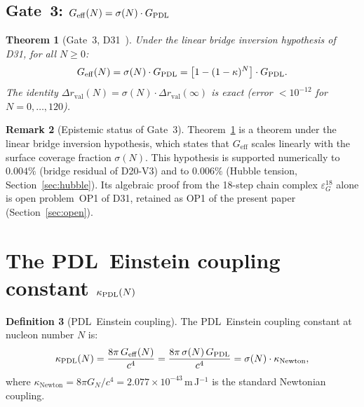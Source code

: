 \documentclass[11pt,a4paper]{article}
\newtheorem{theorem}{Theorem}[section]
\theoremstyle{definition}
\newtheorem{definition}[theorem]{Definition}
\newtheorem{remark}[theorem]{Remark}
\newcommand{\PDL}{\textnormal{PDL}}
\newcommand{\GPDL}{G_{\PDL}}
\newcommand{\Geff}{G_{\mathrm{eff}}}
\newcommand{\sig}{\sigma}
\newcommand{\kap}{\kappa}
\newcommand{\kPDL}{\kappa_{\PDL}}
\begin{document}
\subsection{Gate~3: \texorpdfstring{$\Geff(N) = \sig(N) \cdot \GPDL$}{Geff(N) = sigma(N) * GPDL}}

\begin{theorem}[Gate~3, D31~\cite{PDL_D31_2026}]
\label{thm:gate3}
Under the linear bridge inversion hypothesis of D31, for all $N \geq 0$:
\begin{equation}
\Geff(N) = \sig(N)\cdot\GPDL = \bigl[1-(1-\kap)^N\bigr]\cdot\GPDL.
\label{eq:Geff}
\end{equation}
The identity $\Delta r_{\mathrm{val}}(N) = \sig(N)\cdot\Delta r_{\mathrm{val}}(\infty)$ is exact (error $< 10^{-12}$ for $N = 0,\ldots,120$).
\end{theorem}

\begin{remark}[Epistemic status of Gate~3]
\label{rem:gate3_status}
Theorem~\ref{thm:gate3} is a theorem under the linear bridge inversion hypothesis, which states that $\Geff$ scales linearly with the surface coverage fraction $\sig(N)$. This hypothesis is supported numerically to $0.004\%$ (bridge residual of D20-V3) and to $0.006\%$ (Hubble tension, Section~\ref{sec:hubble}). Its algebraic proof from the 18-step chain complex $\varepsilon_G^{18}$ alone is open problem~OP1 of D31, retained as OP1 of the present paper (Section~\ref{sec:open}).
\end{remark}

\section{The \PDL\ Einstein coupling constant \texorpdfstring{$\kPDL(N)$}{kappa	extsubscript{PDL}(N)}}
\label{sec:kappa}

\begin{definition}[\PDL\ Einstein coupling]
\label{def:kappa_PDL}
The \PDL\ Einstein coupling constant at nucleon number $N$ is:
\begin{equation}
\kPDL(N) = \frac{8\pi\,\Geff(N)}{c^4} = \frac{8\pi\,\sig(N)\,\GPDL}{c^4} = \sig(N)\cdot\kappa_{\mathrm{Newton}},
\label{eq:kappa_PDL}
\end{equation}
where $\kappa_{\mathrm{Newton}} = 8\pi G_N/c^4 = 2.077\times10^{-43}$\,m\,J$^{-1}$ is the standard Newtonian coupling.
\end{definition}
\end{document}
